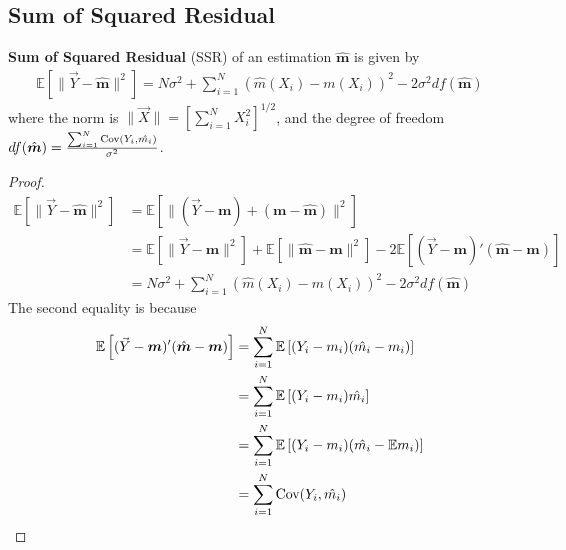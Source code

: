 \documentclass[11pt]{elegantbook}
\begin{document}
\subsection*{Sum of Squared Residual}
\begin{proposition}
    \textbf{Sum of Squared Residual} (SSR) of an estimation $\hat{\boldsymbol{m}}$ is given by
    \begin{equation}
        \begin{aligned}
            \mathbb{E}\left[\|\vec{Y}-\hat{\boldsymbol{m}}\|^2\right]=N\sigma^2+\sum_{i=1}^N\left(\hat{m}(X_i)-m(X_i)\right)^2-2\sigma^2 df(\hat{\boldsymbol{m}})
        \end{aligned}
        \tag{SSR}
        \label{SSR}
    \end{equation}
    where the norm is $\|\vec{X}\|=\left[\sum_{i=1}^N X_i^2\right]^{1/2}$, and the degree of freedom $df(\hat{\boldsymbol{m}})=\frac{\sum_{i=1}^N \textnormal{Cov}(Y_i,\hat{m_i})}{\sigma^2}$.
\end{proposition}
\begin{proof}
    \begin{equation}
        \begin{aligned}
            \mathbb{E}\left[\|\vec{Y}-\hat{\boldsymbol{m}}\|^2\right]&=\mathbb{E}\left[\|(\vec{Y}-\boldsymbol{m})+(\boldsymbol{m}-\hat{\boldsymbol{m}})\|^2\right]\\
            &=\mathbb{E}\left[\|\vec{Y}-\boldsymbol{m}\|^2\right]+\mathbb{E}\left[\|\hat{\boldsymbol{m}}-\boldsymbol{m}\|^2\right]-2 \mathbb{E}\left[(\vec{Y}-\boldsymbol{m})'(\hat{\boldsymbol{m}}-\boldsymbol{m})\right]\\
            &=N\sigma^2+\sum_{i=1}^N\left(\hat{m}(X_i)-m(X_i)\right)^2-2\sigma^2 df(\hat{\boldsymbol{m}})
        \end{aligned}
        \nonumber
    \end{equation}
    The second equality is because
    \begin{equation}
        \begin{aligned}
            \mathbb{E}\left[(\vec{Y}-\boldsymbol{m})'(\hat{\boldsymbol{m}}-\boldsymbol{m})\right]&=\sum_{i=1}^N \mathbb{E}\left[(Y_i-m_i)(\hat{m_i}-m_i)\right]\\
            &=\sum_{i=1}^N \mathbb{E}\left[(Y_i-m_i)\hat{m_i}\right]\\
            &=\sum_{i=1}^N \mathbb{E}\left[(Y_i-m_i)(\hat{m_i}-\mathbb{E}m_i)\right]\\
            &=\sum_{i=1}^N \textnormal{Cov}(Y_i,\hat{m_i})
        \end{aligned}
        \nonumber
    \end{equation}
\end{proof}
\end{document}
